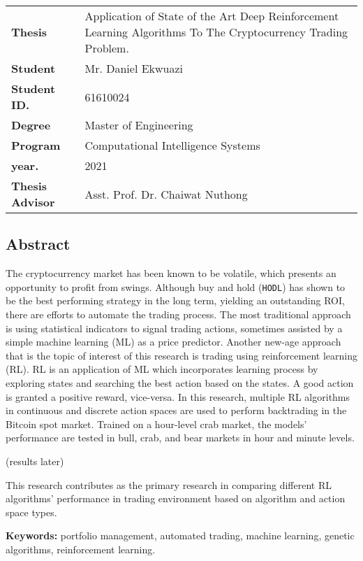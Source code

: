 

\noindent\begin{tabularx}{\textwidth}{lX}
\textbf{Thesis} & Application of State of the Art Deep Reinforcement Learning Algorithms To The Cryptocurrency Trading Problem.\\
\textbf{Student} & Mr. Daniel Ekwuazi\\
\textbf{Student ID.} & 61610024 \\
\textbf{Degree} & Master of Engineering \\
\textbf{Program} & Computational Intelligence Systems \\
\textbf{year.} & 2021 \\
\textbf{Thesis Advisor \indent\indent} & Asst. Prof. Dr. Chaiwat Nuthong \\
\end{tabularx}

\begin{center}
\section*{\LARGE Abstract}

The cryptocurrency market has been known to be volatile, which presents an opportunity to profit from swings. Although buy and hold (\texttt{HODL}) has shown to be the best performing strategy in the long term, yielding an outstanding ROI, there are efforts to automate the trading process. The most traditional approach is using statistical indicators to signal trading actions, sometimes assisted by a simple machine learning (ML) as a price predictor. Another new-age approach that is the topic of interest of this research is trading using reinforcement learning (RL). RL is an application of ML which incorporates learning process by exploring states and searching the best action based on the states. A good action is granted a positive reward, vice-versa. In this research, multiple RL algorithms in continuous and discrete action spaces are used to perform backtrading in the Bitcoin spot market. Trained on a hour-level crab market, the models' performance are tested in bull, crab, and bear markets in hour and minute levels.

(results later)

This research contributes as the primary research in comparing different RL algorithms' performance in trading environment based on algorithm and action space types.

\textbf{Keywords:} portfolio management, automated trading, machine learning, genetic algorithms, reinforcement learning.

\end{center}


